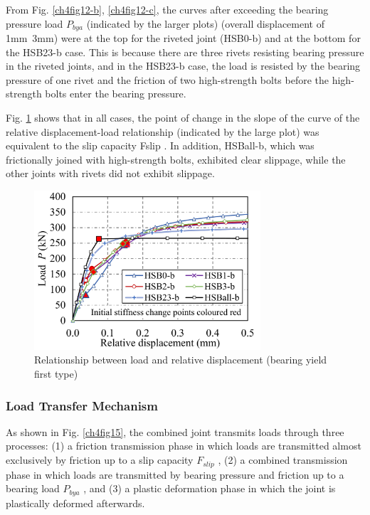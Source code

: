 From Fig. \ref{ch4fig12-b}, \ref{ch4fig12-c}, the curves after exceeding the bearing pressure load $P_{bya}$ (indicated by the larger plots) (overall displacement of 1mm~3mm) were at the top for the riveted joint (HSB0-b) and at the bottom for the HSB23-b case. This is because there are three rivets resisting bearing pressure in the riveted joints, and in the HSB23-b case, the load is resisted by the bearing pressure of one rivet and the friction of two high-strength bolts before the high-strength bolts enter the bearing pressure.

Fig. \ref{ch4fig14} shows that in all cases, the point of change in the slope of the curve of the relative displacement-load relationship (indicated by the large plot) was equivalent to the slip capacity Fslip . In addition, HSBall-b, which was frictionally joined with high-strength bolts, exhibited clear slippage, while the other joints with rivets did not exhibit slippage.

\begin{figure}[htbp]
    \centering
    \includegraphics[width=0.75\textwidth]{imgs/ch4/fig14.pdf}
    \caption{Relationship between load and relative displacement (bearing yield first type)}
    \label{ch4fig14}
\end{figure}

\subsubsection{Load Transfer Mechanism}

As shown in Fig. \ref{ch4fig15}, the combined joint transmits loads through three processes: (1) a friction transmission phase in which loads are transmitted almost exclusively by friction up to a slip capacity $F_{slip}$ , (2) a combined transmission phase in which loads are transmitted by bearing pressure and friction up to a bearing load $P_{bya}$ , and (3) a plastic deformation phase in which the joint is plastically deformed afterwards.

